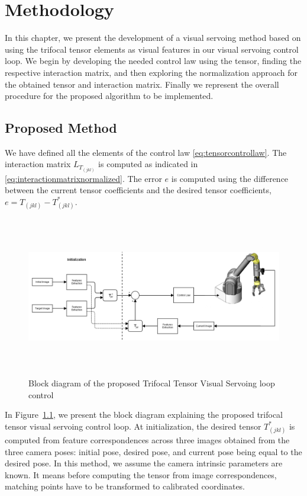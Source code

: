 \chapter{Methodology} \label{chap:methodology}

In this chapter, we present the development of a visual servoing method based on using the trifocal tensor elements as visual features in our visual servoing control loop. We begin by developing the needed control law using the tensor, finding the respective interaction matrix, and then exploring the normalization approach for the obtained tensor and interaction matrix. Finally we represent the overall procedure for the proposed algorithm to be implemented.


\clearpage

\newpage
\section{Proposed Method}
We have defined all the elements of the control law \eqref{eq:tensorcontrollaw}. The interaction matrix $L_{T_{(jkl)}}$ is computed as indicated in \eqref{eq:interactionmatrixnormalized}. The error $e$ is computed using the difference between the current tensor coefficients and the desired tensor coefficients, $e = T_{(jkl)} - T_{(jkl)}^{*}$.

\begin{figure}[ht!]
  \includegraphics[width=150mm,height=70mm]{figures/vsttloop.png}
  \caption{Block diagram of the proposed Trifocal Tensor Visual Servoing loop control}
  \label{fig:vsttloop}
\end{figure}

In Figure~\ref{fig:vsttloop}, we present the block diagram explaining the proposed trifocal tensor visual servoing control loop. At initialization, the desired tensor $T_{(jkl)}^{*}$ is computed from feature correspondences across three images obtained from the three camera poses: initial pose, desired pose, and current pose being equal to the desired pose. In this method, we assume the camera intrinsic parameters are known. It means before computing the tensor from image correspondences, matching points have to be transformed to calibrated coordinates.

